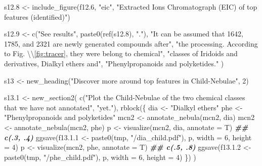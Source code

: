 \documentclass[
]{article}
\newenvironment{Shaded}{\begin{snugshade}}{\end{snugshade}}
\newcommand{\AttributeTok}[1]{\textcolor[rgb]{0.77,0.63,0.00}{#1}}
\newcommand{\DecValTok}[1]{\textcolor[rgb]{0.00,0.00,0.81}{#1}}
\newcommand{\DocumentationTok}[1]{\textcolor[rgb]{0.56,0.35,0.01}{\textbf{\textit{#1}}}}
\newcommand{\FloatTok}[1]{\textcolor[rgb]{0.00,0.00,0.81}{#1}}
\newcommand{\FunctionTok}[1]{\textcolor[rgb]{0.00,0.00,0.00}{#1}}
\newcommand{\NormalTok}[1]{#1}
\newcommand{\OtherTok}[1]{\textcolor[rgb]{0.56,0.35,0.01}{#1}}
\newcommand{\SpecialCharTok}[1]{\textcolor[rgb]{0.00,0.00,0.00}{#1}}
\newcommand{\StringTok}[1]{\textcolor[rgb]{0.31,0.60,0.02}{#1}}
\begin{document}
\begin{Shaded}
\begin{Highlighting}[]
\NormalTok{s12}\FloatTok{.8} \OtherTok{\textless{}{-}} \FunctionTok{include\_figure}\NormalTok{(f12}\FloatTok{.6}\NormalTok{, }\StringTok{"eic"}\NormalTok{,}
  \StringTok{"Extracted Ions Chromatograph (EIC) of top features (identified)"}\NormalTok{)}

\NormalTok{s12}\FloatTok{.9} \OtherTok{\textless{}{-}} \FunctionTok{c}\NormalTok{(}\StringTok{"See results"}\NormalTok{, }\FunctionTok{paste0}\NormalTok{(}\FunctionTok{ref}\NormalTok{(s12}\FloatTok{.8}\NormalTok{), }\StringTok{"."}\NormalTok{),}
  \StringTok{"It can be assumed that 1642, 1785, and 2321 are newly generated compounds after"}\NormalTok{,}
  \StringTok{"the processing. According to Fig. }\SpecialCharTok{\textbackslash{}\textbackslash{}}\StringTok{\ref{fig:tracer}, they were belong to chemical"}\NormalTok{,}
  \StringTok{"classes of \textquotesingle{}Iridoids and derivatives\textquotesingle{}, \textquotesingle{}Dialkyl ethers\textquotesingle{} and"}\NormalTok{,}
  \StringTok{"\textquotesingle{}Phenylpropanoids and polyketides\textquotesingle{}."}
\NormalTok{)}

\NormalTok{s13 }\OtherTok{\textless{}{-}} \FunctionTok{new\_heading}\NormalTok{(}\StringTok{"Discover more around top \textquotesingle{}features\textquotesingle{} in Child{-}Nebulae"}\NormalTok{, }\DecValTok{2}\NormalTok{)}

\NormalTok{s13}\FloatTok{.1} \OtherTok{\textless{}{-}} \FunctionTok{new\_section2}\NormalTok{(}
  \FunctionTok{c}\NormalTok{(}\StringTok{"Plot the Child{-}Nebulae of the two chemical classes that we have not annotated"}\NormalTok{,}
    \StringTok{"yet."}\NormalTok{),}
  \FunctionTok{rblock}\NormalTok{(\{}
\NormalTok{    dia }\OtherTok{\textless{}{-}} \StringTok{"Dialkyl ethers"}
\NormalTok{    phe }\OtherTok{\textless{}{-}} \StringTok{"Phenylpropanoids and polyketides"}
\NormalTok{    mcn2 }\OtherTok{\textless{}{-}} \FunctionTok{annotate\_nebula}\NormalTok{(mcn2, dia)}
\NormalTok{    mcn2 }\OtherTok{\textless{}{-}} \FunctionTok{annotate\_nebula}\NormalTok{(mcn2, phe)}
\NormalTok{    p }\OtherTok{\textless{}{-}} \FunctionTok{visualize}\NormalTok{(mcn2, dia, }\AttributeTok{annotate =}\NormalTok{ T)}
    \DocumentationTok{\#\# c(.3, .4)}
    \FunctionTok{ggsave}\NormalTok{(f13.}\FloatTok{1.1} \OtherTok{\textless{}{-}} \FunctionTok{paste0}\NormalTok{(tmp, }\StringTok{"/dia\_child.pdf"}\NormalTok{), p, }\AttributeTok{width =} \DecValTok{6}\NormalTok{, }\AttributeTok{height =} \DecValTok{4}\NormalTok{)}
\NormalTok{    p }\OtherTok{\textless{}{-}} \FunctionTok{visualize}\NormalTok{(mcn2, phe, }\AttributeTok{annotate =}\NormalTok{ T)}
    \DocumentationTok{\#\# c(.5, .8)}
    \FunctionTok{ggsave}\NormalTok{(f13.}\FloatTok{1.2} \OtherTok{\textless{}{-}} \FunctionTok{paste0}\NormalTok{(tmp, }\StringTok{"/phe\_child.pdf"}\NormalTok{), p, }\AttributeTok{width =} \DecValTok{6}\NormalTok{, }\AttributeTok{height =} \DecValTok{4}\NormalTok{)}
\NormalTok{  \})}
\NormalTok{)}


\end{Highlighting}
\end{Shaded}
\end{document}
